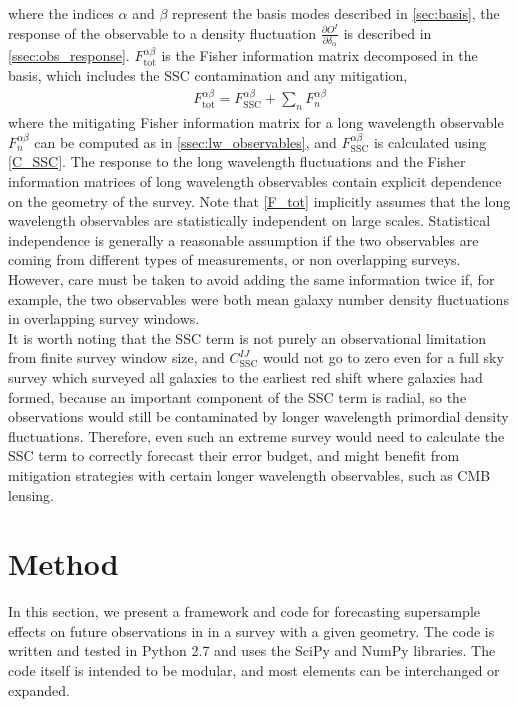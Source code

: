 \documentclass[a4paper,11pt]{article}
\begin{document}
where the indices $\alpha$ and $\beta$ represent the basis modes described in \ref{sec:basis}, the response of the observable to a density fluctuation $\frac{\partial O^I}{\partial \delta_\alpha}$ is described in \ref{ssec:obs_response}. $F^{\alpha\beta}_\text{tot}$ is the Fisher information matrix decomposed in the basis, which includes the SSC contamination and any mitigation,
\begin{align}\label{F_tot}
F^{\alpha\beta}_{\text{tot}} = F^{\alpha\beta}_{\text{SSC}}+\sum_{n}{F^{\alpha\beta}_{n}}
\end{align}
where the mitigating Fisher information matrix for a long wavelength observable $F^{\alpha\beta}_{n}$ can be computed as in \ref{ssec:lw_observables}, and $F^{\alpha\beta}_{\text{SSC}}$ is calculated using \eqref{C_SSC}. The response to the long wavelength fluctuations and the Fisher information matrices of long wavelength observables contain explicit dependence on the geometry of the survey. Note that \eqref{F_tot} implicitly assumes that the long wavelength observables are statistically independent on large scales. Statistical independence is generally a reasonable assumption if the two observables are coming from different types of measurements, or non overlapping surveys. However, care must be taken to avoid adding the same information twice if, for example, the two observables were both mean galaxy number density fluctuations in overlapping survey windows. 
\\
It is worth noting that the SSC term is not purely an observational limitation from finite survey window size, and $C^{IJ}_{\text{SSC}}$ would not go to zero even for a full sky survey which surveyed all galaxies to the earliest red shift where galaxies had formed, because an important component of the SSC term is radial, so the observations would still be contaminated by longer wavelength primordial density fluctuations. Therefore, even such an extreme survey would need to calculate the SSC term to correctly forecast their error budget, and might benefit from mitigation strategies with certain longer wavelength observables, such as CMB lensing.
\section{Method}
\label{sec:method}
In this section, we present a framework and code for forecasting supersample effects on future observations in in a survey with a given geometry. The code is written and tested in Python 2.7 and uses the SciPy\cite{scipy} and NumPy\cite{numpy} libraries. The code itself is intended to be modular, and most elements can be interchanged or expanded. 
\end{document}
